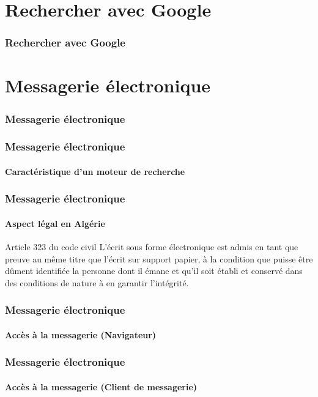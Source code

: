 \documentclass{beamer}
\begin{document}
\section{Rechercher avec Google}

\begin{frame}
\frametitle{Rechercher avec Google}

\end{frame}

\section{Messagerie électronique}

\begin{frame}
\frametitle{Messagerie électronique}

\end{frame}

\begin{frame}
\frametitle{Messagerie électronique}
\framesubtitle{Caractéristique d'un moteur de recherche}

\end{frame}

\begin{frame}
\frametitle{Messagerie électronique}
\framesubtitle{Aspect légal en Algérie}


\begin{block}{Article 323 du code civil}
	L'écrit sous forme électronique est admis en tant que preuve au même titre que l'écrit sur support papier, à la condition que puisse être dûment identifiée la personne dont il émane et qu’il soit établi et conservé dans des conditions de nature à en garantir l'intégrité.
\end{block}

\end{frame}

\begin{frame}
\frametitle{Messagerie électronique}
\framesubtitle{Accès à la messagerie (Navigateur)}

\end{frame}

\begin{frame}
\frametitle{Messagerie électronique}
\framesubtitle{Accès à la messagerie (Client de messagerie)}

\end{frame}
\end{document}
